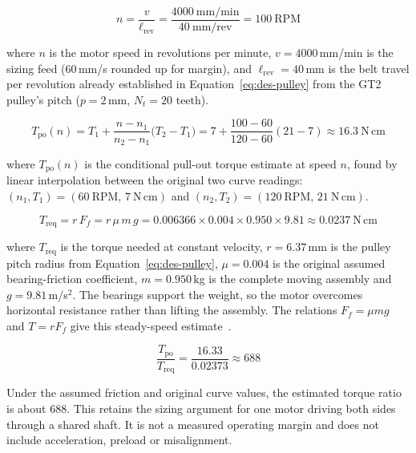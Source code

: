 \begin{equation}
n = \frac{v}{\ell_{\mathrm{rev}}} = \frac{4000\ \mathrm{mm/min}}{40\ \mathrm{mm/rev}} = 100\ \mathrm{RPM}
\label{eq:gan-rpm}
\end{equation}

where $n$ is the motor speed in revolutions per minute, $v=4000$\,mm/min is the sizing feed (60\,mm/s rounded up for margin), and $\ell_{\mathrm{rev}}=40$\,mm is the belt travel per revolution already established in Equation~\ref{eq:des-pulley} from the GT2 pulley's pitch ($p=2$\,mm, $N_t=20$ teeth).

\begin{equation}
T_{\mathrm{po}}(n) = T_1 + \frac{n-n_1}{n_2-n_1}\bigl(T_2-T_1\bigr) = 7 + \frac{100-60}{120-60}(21-7) \approx 16.3\ \mathrm{N\,cm}
\label{eq:gan-pullout}
\end{equation}

where $T_{\mathrm{po}}(n)$ is the conditional pull-out torque estimate at speed $n$, found by linear interpolation between the original two curve readings: $(n_1,T_1)=(60\ \mathrm{RPM},\,7\ \mathrm{N\,cm})$ and $(n_2,T_2)=(120\ \mathrm{RPM},\,21\ \mathrm{N\,cm})$. 

\begin{equation}
T_{\mathrm{req}} = r\,F_f = r\,\mu\,m\,g = 0.006366 \times 0.004 \times 0.950 \times 9.81 \approx 0.0237\ \mathrm{N\,cm}
\label{eq:des-torque}
\end{equation}

where $T_{\mathrm{req}}$ is the torque needed at constant velocity, $r=6.37$\,mm is the pulley pitch radius from Equation~\ref{eq:des-pulley}, $\mu=0.004$ is the original assumed bearing-friction coefficient, $m=0.950$\,kg is the complete moving assembly and $g=9.81$\,m/s$^2$. The bearings support the weight, so the motor overcomes horizontal resistance rather than lifting the assembly. The relations $F_f=\mu mg$ and $T=rF_f$ give this steady-speed estimate~\cite{acarnley2002}.

\begin{equation}
\frac{T_{\mathrm{po}}}{T_{\mathrm{req}}} = \frac{16.33}{0.02373} \approx 688
\label{eq:gan-margin}
\end{equation}

Under the assumed friction and original curve values, the estimated torque ratio is about 688. This retains the sizing argument for one motor driving both sides through a shared shaft. It is not a measured operating margin and does not include acceleration, preload or misalignment.

